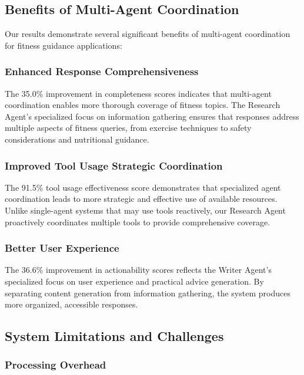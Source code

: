 \documentclass[conference]{IEEEtran}
\begin{document}
\subsection{Benefits of Multi-Agent Coordination}

Our results demonstrate several significant benefits of multi-agent coordination for fitness guidance applications:

\subsubsection{Enhanced Response Comprehensiveness}

The 35.0\% improvement in completeness scores indicates that multi-agent coordination enables more thorough coverage of fitness topics. The Research Agent's specialized focus on information gathering ensures that responses address multiple aspects of fitness queries, from exercise techniques to safety considerations and nutritional guidance.

\subsubsection{Improved Tool Usage Strategic Coordination}

The 91.5\% tool usage effectiveness score demonstrates that specialized agent coordination leads to more strategic and effective use of available resources. Unlike single-agent systems that may use tools reactively, our Research Agent proactively coordinates multiple tools to provide comprehensive coverage.

\subsubsection{Better User Experience}

The 36.6\% improvement in actionability scores reflects the Writer Agent's specialized focus on user experience and practical advice generation. By separating content generation from information gathering, the system produces more organized, accessible responses.

\subsection{System Limitations and Challenges}

\subsubsection{Processing Overhead}
\end{document}
